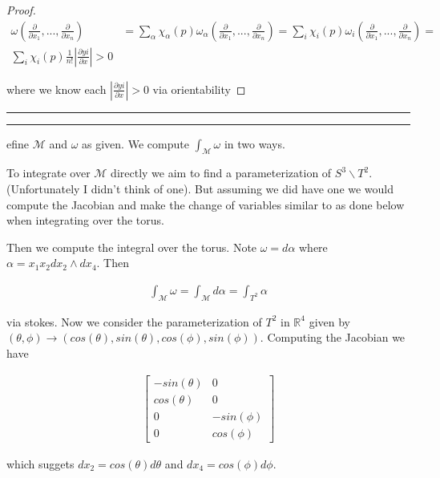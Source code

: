 \documentclass[11pt]{article}
\newcommand{\R}{\mathbb{R}}
\newcommand{\m}{\mathcal{M}}
\newcommand{\question}[2] {\vspace{.25in} \hrule\vspace{0.5em}
\noindent{\bf #1: #2} \vspace{0.5em}
\hrule \vspace{.10in}}
\begin{document}
\begin{proof}
	\begin{align*}
		\omega(\frac{\partial}{\partial x_1},...,\frac{\partial}{\partial x_n}) &= \sum_{\alpha} \chi_{\alpha}(p) \omega_{\alpha}(\frac{\partial}{\partial x_1},...,\frac{\partial}{\partial x_n}) = \sum_i \chi_{i}(p) \omega_{i}(\frac{\partial}{\partial x_1},...,\frac{\partial}{\partial x_n}) = \\
		\sum_i \chi_{i}(p) \frac{1}{n!}|\frac{\partial yi}{\partial x}| > 0
	\end{align*}

	where we know each $|\frac{\partial yi}{\partial x}| > 0$ via orientability
\end{proof}

\question{Question 2}

Define $\m$ and $\omega$ as given. We compute $\int_{\m} \omega$ in two ways.




To integrate over $\m$ directly we aim to find a parameterization of $S^3 \backslash T^2$. (Unfortunately I didn't think of one). But assuming we did have one we would compute the Jacobian and make the change of variables similar to as done below when integrating over the torus.

Then we compute the integral over the torus. Note $\omega = d\alpha$ where $\alpha = x_1x_2 dx_2 \wedge dx_4$. Then


\begin{align*}
	\int_{\m} \omega = \int_{\m} d\alpha = \int_{T^2} \alpha
\end{align*}

via stokes. Now we consider the parameterization of $T^2$ in $\R^4$ given by $(\theta,\phi) \to (cos(\theta),sin(\theta),cos(\phi),sin(\phi))$. Computing the Jacobian we have

\begin{align*}
	\begin{bmatrix}
		- sin(\theta) & 0\\
		cos(\theta) & 0 \\
		0 & -sin(\phi) \\
		0 & cos(\phi)
	\end{bmatrix}
\end{align*}

which suggets $dx_2 = cos(\theta)d\theta$ and $dx_4 = cos(\phi)d\phi$. 
\end{document}
